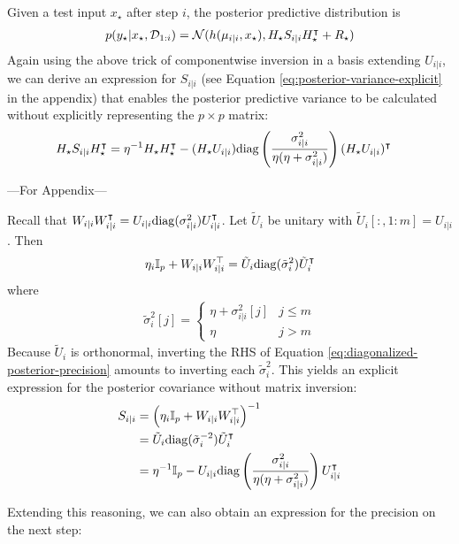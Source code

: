 Given a test input $x_\star$ after step $i$, the posterior predictive distribution is
\begin{align}
    p(y_\star|x_\star,{\mathcal{D}}_{1:i}) = \mathcal{N}(h(\mu_{i|i},x_\star),H_\star S_{i|i} H_\star^\intercal + R_\star)
\end{align}
Again using the above trick of componentwise inversion in a basis extending $U_{i|i}$, we can derive an expression for $S_{i|i}$ (see Equation \eqref{eq:posterior-variance-explicit} in the appendix) that enables the posterior predictive variance to be calculated without explicitly representing the $p\times p$ matrix:
\begin{align}
    H_\star S_{i|i} H_\star^\intercal &= \eta^{-1}H_\star H_\star^\intercal - (H_\star U_{i|i}) \mathrm{diag}\left(\frac{\sigma^2_{i|i}}{\eta(\eta+\sigma^2_{i|i})}\right) (H_\star U_{i|i})^\intercal
\end{align}

---For Appendix---

Recall that 
$W_{i|i}W_{i|i}^\intercal = U_{i|i}\mathrm{diag}(\sigma^2_{i|i})U_{i|i}^\intercal$. 
Let $\tilde{U}_i$ be unitary with 
$\tilde{U}_i[:,1:m] = U_{i|i}$. Then 
\begin{align}
\eta_{i}\mathbb{I}_{p}+W_{i\vert i}W_{i\vert i}^{\top} = \tilde{U}_i\mathrm{diag}(\tilde{\sigma}_i^2)\tilde{U}_i^\intercal
\label{eq:diagonalized-posterior-precision}
\end{align}
where 
\begin{align}
\tilde{\sigma}_i^2[j] = \begin{cases} \eta + \sigma^2_{i|i}[j] & j\le m \\
\eta & j>m
\end{cases}
\end{align}
Because $\tilde{U}_i$ is orthonormal, inverting the RHS of Equation \eqref{eq:diagonalized-posterior-precision} amounts to inverting each $\tilde{\sigma}^2_i$. This yields an explicit expression for the posterior covariance without matrix inversion:
\begin{align}
S_{i|i} &= \left(\eta_{i}\mathbb{I}_{p}+W_{i\vert i}W_{i\vert i}^{\top}\right)^{-1} \\
&= \tilde{U}_i\mathrm{diag}(\tilde{\sigma}_i^{-2})\tilde{U}_i^\intercal \\
&= \eta^{-1}\mathbb{I}_p - U_{i|i}\mathrm{diag}\left(\frac{\sigma^2_{i|i}}{\eta(\eta+\sigma^2_{i|i})}\right)U_{i|i}^\intercal \label{eq:posterior-variance-explicit}
\end{align}

Extending this reasoning, we can also obtain an expression for the precision on the next step:

